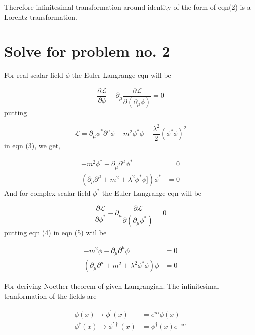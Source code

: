 \documentclass[12pt, letterpaper]{article}
\newcommand*{\1}{\hspace{1pt}}
\begin{document}
Therefore infinitesimal transformation around identity of the form of eqn(2) is a Lorentz transformation.

\section*{Solve for problem no. 2}
For real scalar field $\phi$ the Euler-Langrange eqn will be 

\begin{equation}
    \frac{\partial \mathcal{L}}{\partial \phi} - \partial _{\mu} \frac{\partial \mathcal{L}}{\partial ( \partial _{\mu} \phi)} = 0
\end{equation}
putting 

\begin{equation}
    \mathcal{L} = \partial _{\mu} \phi ^{*} \partial ^{\mu} \phi - m^{2} \phi ^{*} \phi - \frac{\lambda ^{2}}{2} (\phi ^{*} \phi) ^{2}
\end{equation}
in eqn (3), we get,

\begin{align*}
    -m ^{2} \phi ^{*} - \partial _{\mu} \partial ^{\mu} \phi ^{*} &= 0 \\
    (\partial _{\mu} \partial ^{\mu} + m ^{2} + \lambda ^{2} \phi^{*} \phi]) \phi ^{*} &= 0
\end{align*}
And for complex scalar field $\phi ^{*}$ the Euler-Langrange eqn will be

\begin{equation}
    \frac{\partial \mathcal{L}}{\partial \phi ^{*}} - \partial _{\mu} \frac{\partial \mathcal{L}}{\partial ( \partial _{\mu} \phi ^{*})} = 0
\end{equation}
 putting eqn (4) in eqn (5) wiil be

\begin{align*}
    -m ^{2} \phi - \partial _{\mu} \partial ^{\mu} \phi &= 0 \\
    (\partial _{\mu} \partial ^{\mu} + m ^{2} + \lambda ^{2} \phi ^{*} \phi) \phi &= 0
\end{align*}

For deriving Noether theorem of given Langrangian. The infinitesimal tranformation of the fields are 

\begin{align*}
    \phi (x) \to \phi ^{\prime} (x) &= e ^{i \alpha} \phi (x) \\
    \phi ^{\dagger} (x) \to \phi ^{ \prime \dagger} (x) &= \phi ^{\dagger} (x) e ^{-i \alpha}
\end{align*}
\end{document}
